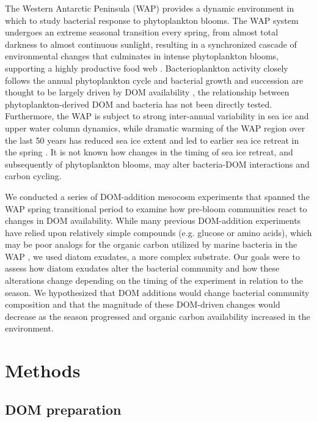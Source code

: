 The Western Antarctic Peninsula (WAP) provides a dynamic environment in which to study bacterial response to phytoplankton blooms. The WAP system undergoes an extreme seasonal transition every spring, from almost total darkness to almost continuous sunlight, resulting in a synchronized cascade of environmental changes that culminates in intense phytoplankton blooms, supporting a highly productive food web \citep{Venables2013-me,Smetacek2005-tz}. Bacterioplankton activity closely follows the annual phytoplankton cycle and bacterial growth and succession are thought to be largely driven by DOM availability \citep{Kirchman2009-sg,dsvse12}, the relationship between phytoplankton-derived DOM and bacteria has not been directly tested. Furthermore, the WAP is subject to strong inter-annual variability in sea ice and upper water column dynamics, while dramatic warming of the WAP region over the last 50 years has reduced sea ice extent and led to earlier sea ice retreat in the spring \citep{saba2014winter,vaughan1996recent,mk05,thomas2009ice,Stammerjohn2008-nj}. It is not known how changes in the timing of sea ice retreat, and subsequently of phytoplankton blooms, may alter bacteria-DOM interactions and carbon cycling. 

We conducted a series of DOM-addition mesocosm experiments that spanned the WAP spring transitional period to examine how pre-bloom communities react to changes in DOM availability. While many previous DOM-addition experiments have relied upon relatively simple compounds (e.g. glucose or amino acids), which may be poor analogs for the organic carbon utilized by marine bacteria in the WAP \citep{dmegm11,straza2010abundance}, we used diatom exudates, a more complex substrate. Our goals were to assess how diatom exudates alter the bacterial community and how these alterations change depending on the timing of the experiment in relation to the season. We hypothesized that DOM additions would change bacterial community composition and that the magnitude of these DOM-driven changes would decrease as the season progressed and organic carbon availability increased in the environment. 

 

\section{Methods}

\subsection{DOM preparation} 

